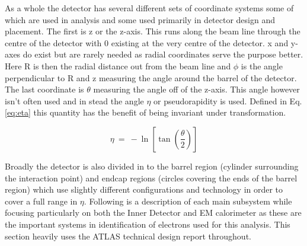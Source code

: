 	As a whole the detector has several different sets of coordinate systems some of which are used in analysis and some used primarily in detector design and placement. The first is z or the z-axis. This runs along the beam line through the centre of the detector with 0 existing at the very centre of the detector. x and y-axes do exist but are rarely needed as radial coordinates serve the purpose better. Here R is then the radial distance out from the beam line and $\phi$ is the angle perpendicular to R and z measuring the angle around the barrel of the detector. The last coordinate is $\theta$ measuring the angle off of the z-axis. This angle however isn't often used and in stead the angle $\eta$ or pseudorapidity is used. Defined in Eq. \ref{eq:eta} this quantity has the benefit of being invariant under transformation.

	\begin{equation}
		\eta~=~-\ln[\tan(\frac{\theta}{2})]
		\label{eq:eta}
	\end{equation}

	Broadly the detector is also divided in to the barrel region (cylinder surrounding the interaction point) and endcap regions (circles covering the ends of the barrel region) which use slightly different configurations and technology in order to cover a full range in $\eta$.
	Following is a description of each main subsystem while focusing particularly on both the Inner Detector and EM calorimeter as these are the important systems in identification of electrons used for this analysis. This section heavily uses the ATLAS technical design report \cite{Aad:1129811} throughout. 



